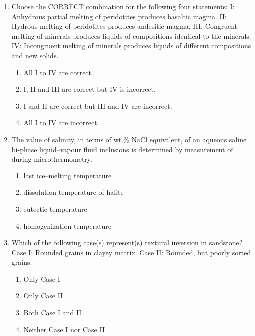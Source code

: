 \documentclass[journal,12pt,onecolumn]{IEEEtran}
\theoremstyle{remark}
\begin{document}
\begin{enumerate}
\item Choose the CORRECT combination for the following four statements:  
I: Anhydrous partial melting of peridotites produces basaltic magma.  
II: Hydrous melting of peridotites produces andesitic magma.  
III: Congruent melting of minerals produces liquids of compositions identical to the minerals.  
IV: Incongruent melting of minerals produces liquids of different compositions and new solids.  
\begin{multicols}{2}
\begin{enumerate}
\item All I to IV are correct.
\item I, II and III are correct but IV is incorrect.
\item I and II are correct but III and IV are incorrect.
\item All I to IV are incorrect.
\end{enumerate}
\end{multicols}

\item The value of salinity, in terms of wt.\% NaCl equivalent, of an aqueous saline bi-phase liquid--vapour fluid inclusions is determined by measurement of \_\_\_ during microthermometry.  
\begin{enumerate}
\item last ice--melting temperature
\item dissolution temperature of halite
\item eutectic temperature
\item homogenization temperature
\end{enumerate}

\item Which of the following case(s) represent(s) textural inversion in sandstone?  
Case I: Rounded grains in clayey matrix.  
Case II: Rounded, but poorly sorted grains.  
\begin{enumerate}
\item Only Case I
\item Only Case II
\item Both Case I and II
\item Neither Case I nor Case II
\end{enumerate}

\end{enumerate}
\end{document}
